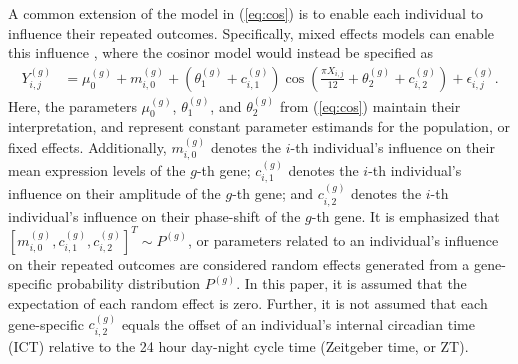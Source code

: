 A common extension of the model in (\ref{eq:cos}) is to enable each individual to influence their repeated outcomes. Specifically, mixed effects models can enable this influence \citep{Davidian1995, Hedeker2006, McCulloch2000}, where the cosinor model would instead be specified as
\begin{align} \label{eq:cos_m}
    Y^{(g)}_{i,j} &= \mu_0^{(g)} + m_{i,0}^{(g)} + (\theta^{(g)}_1+c^{(g)}_{i,1})\cos\left(\frac{\pi X_{i,j}}{12} + \theta_2^{(g)}+c_{i,2}^{(g)}\right)+\epsilon^{(g)}_{i,j}.
\end{align}
Here, the parameters $\mu_0^{(g)}$, $\theta^{(g)}_1$, and $\theta^{(g)}_2$ from (\ref{eq:cos}) maintain their interpretation, and represent constant parameter estimands for the population, or fixed effects. Additionally, $m_{i,0}^{(g)}$ denotes the $i$-th individual's influence on their mean expression levels of the $g$-th gene; $c^{(g)}_{i,1}$ denotes the $i$-th individual's influence on their amplitude of the $g$-th gene; and $c^{(g)}_{i,2}$ denotes the $i$-th individual's influence on their phase-shift of the $g$-th gene. It is emphasized that $[m_{i,0}^{(g)}, c^{(g)}_{i,1}, c^{(g)}_{i,2}]^T \sim P^{(g)}$, or parameters related to an individual's influence on their repeated outcomes are considered random effects generated from a gene-specific probability distribution $P^{(g)}$. In this paper, it is assumed that the expectation of each random effect is zero. Further, it is not assumed that each gene-specific $c^{(g)}_{i,2}$ equals the offset of an individual's internal circadian time (ICT) relative to the 24 hour day-night cycle time (Zeitgeber time, or ZT).

